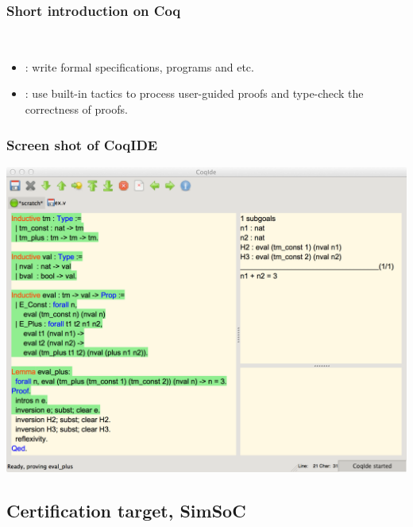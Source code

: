 \documentclass[usenames,dvipsnames]{beamer} %
\begin{document}
\begin{frame}
\frametitle{Short introduction on Coq}
\begin{block}{}
\begin{centering}
 \\ 
\end{centering}
\end{block}
\begin{itemize}
\item {}: write formal specifications, programs and etc.
\item {}: use built-in tactics to process user-guided
  proofs and type-check the correctness of proofs.
\end{itemize}
\end{frame}

\begin{frame}
\frametitle{Screen shot of CoqIDE}
\hfil\includegraphics[width=.95\linewidth]{fig/coqide.pdf}
\end{frame}

\subsection{Certification target, SimSoC}
\end{document}
